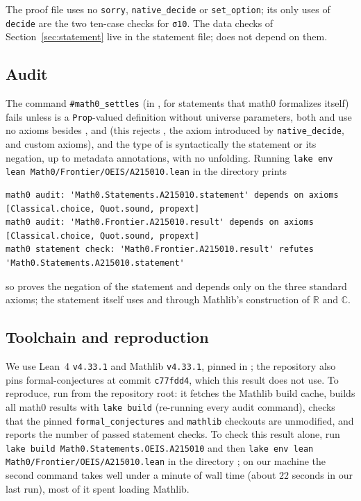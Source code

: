 \documentclass[11pt]{amsart}
\theoremstyle{plain}
\theoremstyle{definition}
\newcommand{\C}{\mathbb{C}}
\begin{document}
The proof file uses no \texttt{sorry}, \texttt{native\_decide} or \texttt{set\_option}; its only uses of \texttt{decide} are the two ten-case checks for \texttt{σ10}.
The data checks of Section~\ref{sec:statement} live in the statement file;  does not depend on them.

\subsection*{Audit}
The command \texttt{\#math0\_settles} (in , for statements that math0 formalizes itself) fails unless  is a \texttt{Prop}-valued definition without universe parameters, both  and  use no axioms besides ,  and  (this rejects , the axiom  introduced by \texttt{native\_decide}, and custom axioms), and the type of  is syntactically the statement or its negation, up to metadata annotations, with no unfolding.
Running \texttt{lake env lean Math0/Frontier/OEIS/A215010.lean} in the directory  prints
\begin{lstlisting}[basicstyle=\ttfamily\scriptsize]
math0 audit: 'Math0.Statements.A215010.statement' depends on axioms [Classical.choice, Quot.sound, propext]
math0 audit: 'Math0.Frontier.A215010.result' depends on axioms [Classical.choice, Quot.sound, propext]
math0 statement check: 'Math0.Frontier.A215010.result' refutes 'Math0.Statements.A215010.statement'
\end{lstlisting}
so  proves the negation of the statement and depends only on the three standard axioms; the statement itself uses  and  through Mathlib's construction of $\mathbb{R}$ and $\C$.

\subsection*{Toolchain and reproduction}
We use Lean~4 \cite{Lean4} \texttt{v4.33.1} and Mathlib \cite{Mathlib} \texttt{v4.33.1}, pinned in ; the repository also pins formal-conjectures \cite{FC} at commit \texttt{c77fdd4}, which this result does not use.
To reproduce, run  from the repository root: it fetches the Mathlib build cache, builds all math0 results with \texttt{lake build} (re-running every audit command), checks that the pinned \texttt{formal\_conjectures} and \texttt{mathlib} checkouts are unmodified, and reports the number of passed statement checks.
To check this result alone, run \texttt{lake build Math0.Statements.OEIS.A215010} and then \texttt{lake env lean Math0/Frontier/OEIS/A215010.lean} in the directory ; on our machine the second command takes well under a minute of wall time (about $22$ seconds in our last run), most of it spent loading Mathlib.
\end{document}
